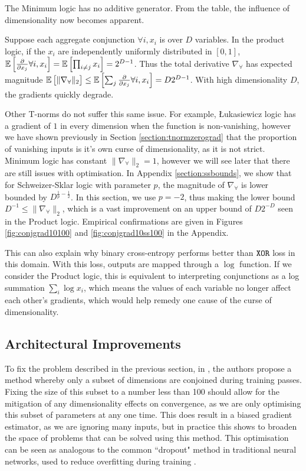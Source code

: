 The Minimum logic has no additive generator. From the table, the influence of dimensionality now becomes apparent. 

Suppose each aggregate conjunction $\forall i, x_i$ is over $D$ variables. In the product logic, if the $x_i$ are independently uniformly distributed in $[0,1]$, $\mathbb{E}\left[\frac{\partial}{\partial x_j} \forall i, x_i\right] = \mathbb{E}\left[\prod_{i \neq j} x_i \right] = 2^{D-1}$. Thus the total derivative $\nabla_\forall$ has expected magnitude $\mathbb{E}\left[\lVert \nabla_\forall \rVert_2\right] \leq \mathbb{E}\left[\sum_j \frac{\partial}{\partial x_j} \forall i, x_i \right] = D2^{D-1}$. With high dimensionality $D$, the gradients quickly degrade.

Other T-norms do not suffer this same issue. For example, Łukasiewicz logic has a gradient of $1$ in every dimension when the function is non-vanishing, however we have shown previously in Section \ref{section:tnormzerograd} that the proportion of vanishing inputs is it's own curse of dimensionality, as it is not strict. Minimum logic has constant $\lVert \nabla_\forall \rVert_2 = 1$, however we will see later that there are still issues with optimisation. In Appendix \ref{section:ssbounds}, we show that for Schweizer-Sklar logic with parameter $p$, the magnitude of $\nabla_\forall$ is lower bounded by $D^{\frac{1}{p}-\frac{1}{2}}$. In this section, we use $p = -2$, thus making the lower bound $D^{-1} \leq \lVert \nabla_\forall \rVert_2$, which is a vast improvement on an upper bound of $D2^{-D}$ seen in the Product logic. Empirical confirmations are given in Figures \ref{fig:conjgrad10100} and \ref{fig:conjgrad10ss100} in the Appendix.

This can also explain why binary cross-entropy performs better than $\texttt{XOR}$ loss in this domain. With this loss, outputs are mapped through a $\log$ function. If we consider the Product logic, this is equivalent to interpreting conjunctions as a log summation $\sum_i\log x_i$, which means the values of each variable no longer affect each other's gradients, which would help remedy one cause of the curse of dimensionality. 

\subsection{Architectural Improvements}

To fix the problem described in the previous section, in \cite{analyzefuzzy}, the authors propose a method whereby only a subset of dimensions are conjoined during training passes. Fixing the size of this subset to a number less than 100 should allow for the mitigation of any dimensionality effects on convergence, as we are only optimising this subset of parameters at any one time. This does result in a biased gradient estimator, as we are ignoring many inputs, but in practice this shows to broaden the space of problems that can be solved using this method. This optimisation can be seen as analogous to the common ``dropout" method in traditional neural networks, used to reduce overfitting during training \cite{dropout}. 

